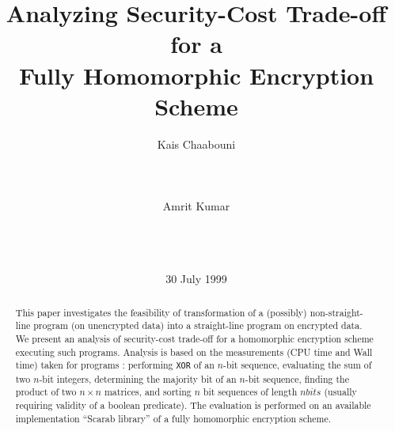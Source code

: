 \documentclass{acm_proc_article-sp}
\begin{document}
\title{Analyzing Security-Cost Trade-off for a \\ Fully Homomorphic Encryption Scheme}


%
\author{
\alignauthor
Kais Chaabouni \\
       \\
       \\
       \\
\alignauthor 
Amrit Kumar\\
       \\
       \\
       \\
}


\date{30 July 1999}
\maketitle
\begin{abstract}
This paper investigates the feasibility of transformation of a (possibly) non-straight-line program (on unencrypted data) into a straight-line program on encrypted data. We present an analysis of security-cost trade-off for a homomorphic encryption scheme executing such programs. Analysis is based on the measurements (CPU time and  Wall time) taken for programs : performing \texttt{XOR} of an $n$-bit sequence,  evaluating the sum of two $n$-bit integers, determining the majority bit of an $n$-bit sequence, finding the product of two $n \times n$ matrices, and sorting $n$ bit sequences of length $nbits$ (usually requiring validity of a boolean predicate). The evaluation is performed on an available implementation ``Scarab library'' of a fully homomorphic encryption scheme. 

\end{abstract}
\end{document}
